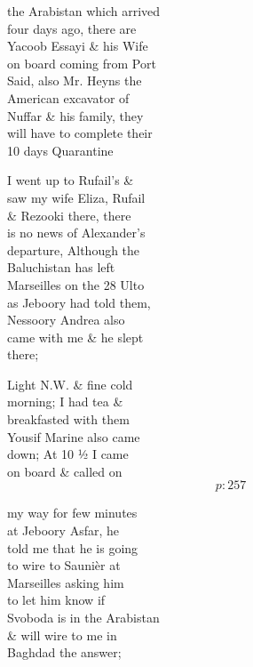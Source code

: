 \documentclass{report}
\begin{document}


	\par{
 	the Arabistan which arrived\ \\four days ago, there are\ \\Yacoob Essayi \& his Wife\ \\on board coming from Port\ \\Said, also Mr. Heyns the\ \\American excavator of\ \\Nuffar \& his family, they\ \\will have to complete their\ \\10 days Quarantine\ \\
	}

	\par{
 	I went up to Rufail’s \&\ \\saw my wife Eliza, Rufail\ \\\& Rezooki there, there\ \\is no news of Alexander’s\ \\departure, Although the\ \\Baluchistan has left\ \\Marseilles on the 28 Ulto\ \\as Jeboory had told them,\ \\Nessoory Andrea also\ \\came with me \& he slept\ \\there;\ \\
	}

	\par{
 	Light N.W. \& fine cold\ \\morning; I had tea \&\ \\breakfasted with them\ \\Yousif Marine also came\ \\down; At 10 ½ I came\ \\on board \& called on\ \\
  \[p: 257 \]

	}



	\par{
 	my way for few minutes\ \\at Jeboory Asfar, he\ \\told me that he is going\ \\to wire to Saunièr at\ \\Marseilles asking him\ \\to let him know if\ \\Svoboda is in the Arabistan\ \\\& will wire to me in\ \\Baghdad the answer;\ \\
	}
\end{document}
